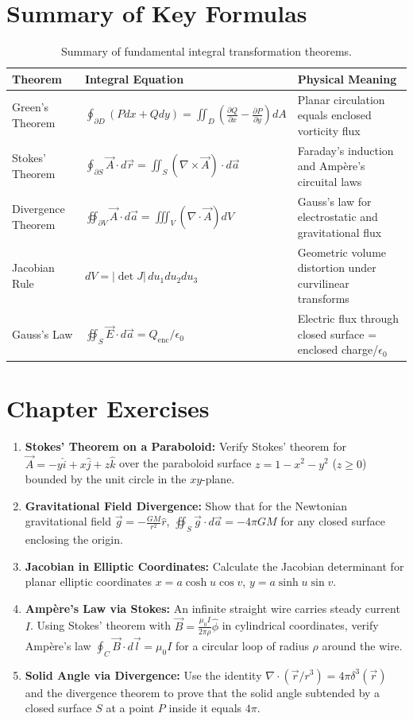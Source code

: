 \section{Summary of Key Formulas}
\begin{table}[H]
\centering
\small
\begin{tabularx}{\textwidth}{llX}
\toprule
\textbf{Theorem} & \textbf{Integral Equation} & \textbf{Physical Meaning} \\
\midrule
Green's Theorem & $\oint_{\partial D} (P dx + Q dy) = \iint_D (\frac{\partial Q}{\partial x} - \frac{\partial P}{\partial y}) dA$ & Planar circulation equals enclosed vorticity flux \\
Stokes' Theorem & $\oint_{\partial S} \vec{A} \cdot d\vec{r} = \iint_S (\nabla \times \vec{A}) \cdot d\vec{a}$ & Faraday's induction and Ampère's circuital laws \\
Divergence Theorem & $\oiint_{\partial V} \vec{A} \cdot d\vec{a} = \iiint_V (\nabla \cdot \vec{A}) dV$ & Gauss's law for electrostatic and gravitational flux \\
Jacobian Rule & $dV = |\det J|\,du_1 du_2 du_3$ & Geometric volume distortion under curvilinear transforms \\
Gauss's Law & $\oiint_S \vec{E}\cdot d\vec{a} = Q_\text{enc}/\epsilon_0$ & Electric flux through closed surface = enclosed charge/$\epsilon_0$ \\
\bottomrule
\end{tabularx}
\caption{Summary of fundamental integral transformation theorems.}
\label{tab:ch07_summary}
\end{table}

\section{Chapter Exercises}
\begin{enumerate}
    \item \textbf{Stokes' Theorem on a Paraboloid:} Verify Stokes' theorem for $\vec{A} = -y\hat{i} + x\hat{j} + z\hat{k}$ over the paraboloid surface $z = 1 - x^2 - y^2$ ($z \ge 0$) bounded by the unit circle in the $xy$-plane.
    \item \textbf{Gravitational Field Divergence:} Show that for the Newtonian gravitational field $\vec{g} = -\frac{GM}{r^2}\hat{r}$, $\oiint_S \vec{g} \cdot d\vec{a} = -4\pi GM$ for any closed surface enclosing the origin.
    \item \textbf{Jacobian in Elliptic Coordinates:} Calculate the Jacobian determinant for planar elliptic coordinates $x = a\cosh u\cos v$, $y = a\sinh u\sin v$.
    \item \textbf{Ampère's Law via Stokes:} An infinite straight wire carries steady current $I$. Using Stokes' theorem with $\vec{B} = \frac{\mu_0 I}{2\pi\rho}\hat{\phi}$ in cylindrical coordinates, verify Ampère's law $\oint_C \vec{B}\cdot d\vec{l} = \mu_0 I$ for a circular loop of radius $\rho$ around the wire.
    \item \textbf{Solid Angle via Divergence:} Use the identity $\nabla \cdot (\vec{r}/r^3) = 4\pi\delta^3(\vec{r})$ and the divergence theorem to prove that the solid angle subtended by a closed surface $S$ at a point $P$ inside it equals $4\pi$.
\end{enumerate}
